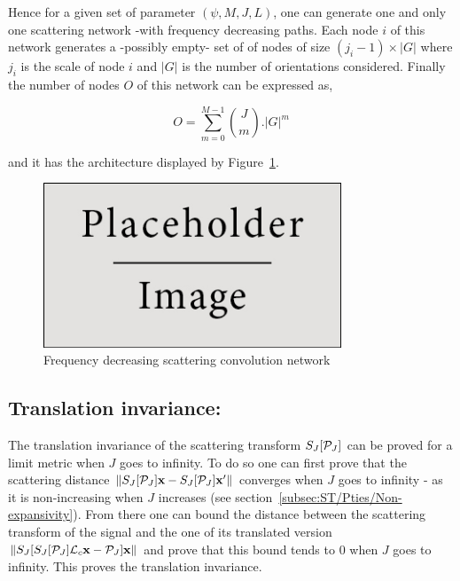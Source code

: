\documentclass[a4paper,11pt]{report}
\begin{document}
			Hence for a given set of parameter $(\psi, M,J,L)$, one can generate one and only one scattering network -with frequency decreasing paths. Each node $i$ of this network generates a -possibly empty- set of of nodes of size $(j_{i}-1) \times |G|$ where $j_{i}$ is the scale of node $i$ and $|G|$ is the number of orientations considered. Finally the number of nodes $O$ of this network can be expressed as,
			
			\begin{equation}
			  O = \sum_{m=0}^{M-1} \binom{J}{m} . |G| ^{m}
			  \label{eq:ST number of node}
			\end{equation}

			and it has the architecture displayed by Figure~\ref{fig:SCN 2}. 
			
			\begin{figure}
				\begin{center}
					\includegraphics[width=3.5in]{placeholder.jpg}
					\caption{Frequency decreasing scattering convolution network}
					\label{fig:SCN 2}
				\end{center}	
      \end{figure}
      
		\subsection{Translation invariance:}
			\label{subsec:ST/Pties/Translation}
			
			The translation invariance of the scattering transform $S_{J}[\mathcal{P}_{J}]$ can be proved for a limit metric when $J$ goes to infinity. To do so one can first prove that the scattering distance $\left\lVert S_{J}[\mathcal{P}_{J}]{\bf x} - S_{J}[\mathcal{P}_{J}]{\bf x}' \right\rVert$ converges when $J$ goes to infinity - as it is non-increasing when $J$ increases (see section~\ref{subsec:ST/Pties/Non-expansivity}). From there one can bound the distance between the scattering transform of the signal and the one of its translated version $\left\lVert S_{J}[ S_{J}[\mathcal{P}_{J}]\mathcal{L}_{c}{\bf x} - \mathcal{P}_{J}]{\bf x} \right\rVert$ and prove that this bound tends to $0$ when $J$ goes to infinity. This proves the translation invariance.
			
\end{document}
